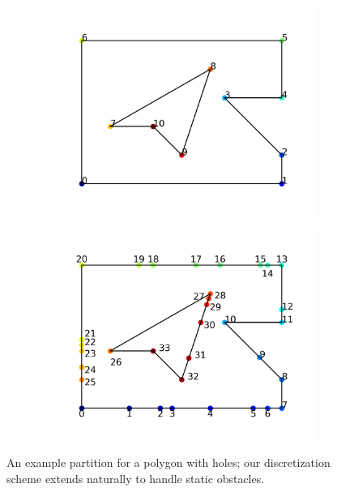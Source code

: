 \documentclass[]{styles/svproc}  %
\begin{document}
\begin{figure}
\centering
\begin{subfigure}{0.5\textwidth}
\centering
\includegraphics[width=0.8\linewidth]{figures/median_holes.png}
\centering
\end{subfigure}%
\begin{subfigure}{0.5\textwidth}
\centering
\includegraphics[width=0.8\linewidth]{figures/median_holes_inserted.png}
\centering
\end{subfigure}
\caption{An example partition for a polygon with holes; our discretization
scheme extends naturally to handle static obstacles.}
\label{fig:bvd_holes}
\end{figure}
\end{document}
